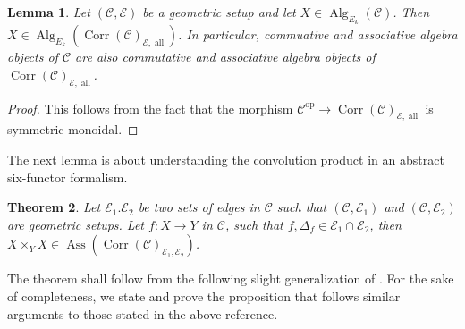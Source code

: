 \documentclass[14pt]{article}
\newtheorem{theorem}{Theorem}[subsection]
\newtheorem{lemma}[theorem]{Lemma}
\theoremstyle{definition}
\newcommand{\CrrCpEal}{\op{Corr}(\Ca)_{\E,\op{all}}}
\newcommand{\E}{\mathcal{E}}
\newcommand{\op}[1]{\operatorname{#1}}
\newcommand{\Ca}{\mathcal{C}}
\numberwithin{subsection}{section}
\begin{document}
\begin{lemma}
    Let $(\Ca,\E)$ be a geometric setup and let $X \in \op{Alg}_{E_k}(\Ca)$. Then $X \in \op{Alg}_{E_k}(\CrrCpEal)$. In particular, commuative and associative algebra objects of $\Ca$ are also commutative and associative algebra objects of $\op{Corr}(\Ca)_{\E,\op{all}}$.
\end{lemma}


\begin{proof}

This follows from the fact that the morphism $\Ca^{\op{op}} \to \CrrCpEal$ is symmetric monoidal.
\end{proof}


 The next lemma is about understanding the convolution product in an abstract six-functor formalism. 

\begin{theorem}\label{abstractconvolutionproduct}
    Let $\E_1.\E_2$ be two sets of edges in $\Ca$ such that $(\Ca,\E_1)$ and $(\Ca,\E_2)$ are geometric setups.  Let $f:X \to Y$ in $\Ca$, such that $f,\Delta_f \in \E_1 \cap \E_2$,  then $X \times_Y X \in \op{Ass}(\op{Corr}(\Ca)_{\E_1,\E_2})$.   
\end{theorem}

The theorem shall follow from the following slight generalization of \cite[Proposition 2.3.9]{heyer20246functorformalismssmoothrepresentations}. For the sake of completeness, we state and prove the proposition that follows similar arguments to those stated in the above reference.
\end{document}
